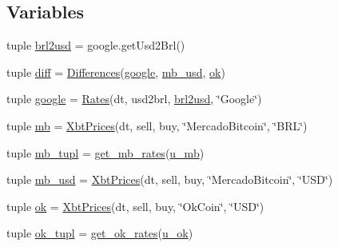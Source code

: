 \subsection*{Variables}
\begin{DoxyCompactItemize}
\item 
tuple \hyperlink{namespaceraw__urlparser_a382c2b22f2386b1e493674c7d72b9b95}{brl2usd} = google.\-get\-Usd2\-Brl()
\item 
tuple \hyperlink{namespaceraw__urlparser_a2a48999f60075fd5b96e6d540cce34c9}{diff} = \hyperlink{classraw__urlparser_1_1_differences}{Differences}(\hyperlink{namespaceraw__urlparser_a8d7c05a0ed7b2f3a3014caa73a2999d1}{google}, \hyperlink{namespaceraw__urlparser_a49f2920b4f7718df58d6d996a1306f32}{mb\-\_\-usd}, \hyperlink{namespaceraw__urlparser_ac9d30be4f20423526dc111ebaba51cfe}{ok})
\item 
tuple \hyperlink{namespaceraw__urlparser_a8d7c05a0ed7b2f3a3014caa73a2999d1}{google} = \hyperlink{classraw__urlparser_1_1_rates}{Rates}(dt, usd2brl, \hyperlink{namespaceraw__urlparser_a382c2b22f2386b1e493674c7d72b9b95}{brl2usd}, \char`\"{}Google\char`\"{})
\item 
tuple \hyperlink{namespaceraw__urlparser_a964275295a1dcba5dbdc3b113a75c4bb}{mb} = \hyperlink{classraw__urlparser_1_1_xbt_prices}{Xbt\-Prices}(dt, sell, buy, \char`\"{}Mercado\-Bitcoin\char`\"{}, \char`\"{}B\-R\-L\char`\"{})
\item 
tuple \hyperlink{namespaceraw__urlparser_ac8242502920772d4c44b42f24492acd5}{mb\-\_\-tupl} = \hyperlink{namespaceraw__urlparser_a56532368ca9848b5f2ab298e3e6232bb}{get\-\_\-mb\-\_\-rates}(\hyperlink{namespaceraw__urlparser_a9a840f174b92a24c415b88c87e84b73d}{u\-\_\-mb})
\item 
tuple \hyperlink{namespaceraw__urlparser_a49f2920b4f7718df58d6d996a1306f32}{mb\-\_\-usd} = \hyperlink{classraw__urlparser_1_1_xbt_prices}{Xbt\-Prices}(dt, sell, buy, \char`\"{}Mercado\-Bitcoin\char`\"{}, \char`\"{}U\-S\-D\char`\"{})
\item 
tuple \hyperlink{namespaceraw__urlparser_ac9d30be4f20423526dc111ebaba51cfe}{ok} = \hyperlink{classraw__urlparser_1_1_xbt_prices}{Xbt\-Prices}(dt, sell, buy, \char`\"{}Ok\-Coin\char`\"{}, \char`\"{}U\-S\-D\char`\"{})
\item 
tuple \hyperlink{namespaceraw__urlparser_a8c2d43346322c5d31fa8cb1a9cf5c121}{ok\-\_\-tupl} = \hyperlink{namespaceraw__urlparser_a3a9d9300bd89d803ca1fddb78145f58e}{get\-\_\-ok\-\_\-rates}(\hyperlink{namespaceraw__urlparser_a22c1a17803a88426d38d70ad6d4290d2}{u\-\_\-ok})
\item 

\end{DoxyCompactItemize}
